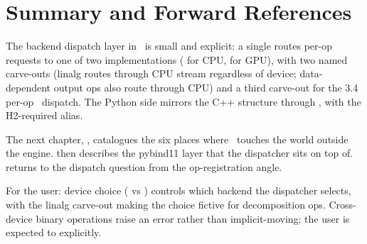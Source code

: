 \section{Summary and Forward References}
\label{sec:backend_dispatch:summary}

The backend dispatch layer in \Lucid\ is small and explicit: a
single  routes per-op requests to one of two
 implementations ( for CPU,
 for GPU), with two named carve-outs (linalg
routes through CPU stream regardless of device; data-dependent
output ops also route through CPU) and a third carve-out for the
3.4 per-op \MPSGraph\ dispatch. The Python side mirrors the C++
structure through , with the H2-required
 alias.

The next chapter, , catalogues the six
places where \Lucid\ touches the world outside the engine.
 then describes the pybind11 layer
that the dispatcher sits on top of.  returns
to the dispatch question from the op-registration angle.

\begin{lucidnote}
For the user: device choice ( vs ) controls
which backend the dispatcher selects, with the linalg carve-out
making the choice fictive for decomposition ops. Cross-device
binary operations raise an error rather than implicit-moving; the
user is expected to  explicitly.
\end{lucidnote}
